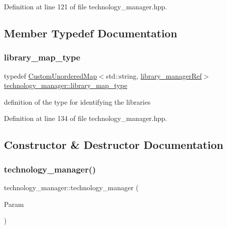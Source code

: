 Definition at line 121 of file technology\+\_\+manager.\+hpp.



\subsection{Member Typedef Documentation}
\mbox{\label{classtechnology__manager_a97826ddbca97f92f63e34c5ef5948319}} 
\subsubsection{\texorpdfstring{library\+\_\+map\+\_\+type}{library\_map\_type}}
{\footnotesize\ttfamily typedef \hyperlink{custom__map_8hpp_ad1ed68f2ff093683ab1a33522b144adc}{Custom\+Unordered\+Map}$<$std\+::string, \hyperlink{library__manager_8hpp_aacc6d633b0aa80ecfeb1180fd480ae68}{library\+\_\+manager\+Ref}$>$ \hyperlink{classtechnology__manager_a97826ddbca97f92f63e34c5ef5948319}{technology\+\_\+manager\+::library\+\_\+map\+\_\+type}}



definition of the type for identifying the libraries 



Definition at line 134 of file technology\+\_\+manager.\+hpp.



\subsection{Constructor \& Destructor Documentation}
\mbox{\label{classtechnology__manager_aca933b39a83c4a9638a79ad19f8b9ff5}} 
\subsubsection{\texorpdfstring{technology\+\_\+manager()}{technology\_manager()}}
{\footnotesize\ttfamily technology\+\_\+manager\+::technology\+\_\+manager (\begin{DoxyParamCaption}\item[{const \hyperlink{Parameter_8hpp_a37841774a6fcb479b597fdf8955eb4ea}{Parameter\+Const\+Ref}}]{Param }\end{DoxyParamCaption})\hspace{0.3cm}{\ttfamily [explicit]}}



